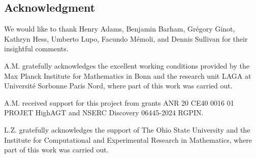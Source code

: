 
\subsection*{Acknowledgment}

We would like to thank Henry Adams, Benjamin Barham, Gr\'egory Ginot, Kathryn Hess, Umberto Lupo, Facundo M\'emoli, and Dennis Sullivan for their insightful comments.

A.M. gratefully acknowledges the excellent working conditions provided by the Max Planck Institute for Mathematics in Bonn and the research unit LAGA at Université Sorbonne Paris Nord, where part of this work was carried out.

A.M. received support for this project from grants ANR 20 CE40 0016 01 PROJET HighAGT and NSERC Discovery 06445-2024 RGPIN.

 L.Z. gratefully acknowledges the support of The Ohio State University and the Institute for Computational and Experimental Research in Mathematics, where part of this work was carried out.
